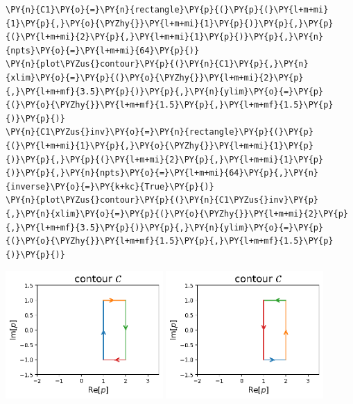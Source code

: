     \begin{tcolorbox}[breakable, size=fbox, boxrule=1pt, pad at break*=1mm,colback=cellbackground, colframe=cellborder]
\begin{Verbatim}[commandchars=\\\{\}]
\PY{n}{C1}\PY{o}{=}\PY{n}{rectangle}\PY{p}{(}\PY{p}{(}\PY{l+m+mi}{1}\PY{p}{,}\PY{o}{\PYZhy{}}\PY{l+m+mi}{1}\PY{p}{)}\PY{p}{,}\PY{p}{(}\PY{l+m+mi}{2}\PY{p}{,}\PY{l+m+mi}{1}\PY{p}{)}\PY{p}{,}\PY{n}{npts}\PY{o}{=}\PY{l+m+mi}{64}\PY{p}{)}
\PY{n}{plot\PYZus{}contour}\PY{p}{(}\PY{n}{C1}\PY{p}{,}\PY{n}{xlim}\PY{o}{=}\PY{p}{(}\PY{o}{\PYZhy{}}\PY{l+m+mi}{2}\PY{p}{,}\PY{l+m+mf}{3.5}\PY{p}{)}\PY{p}{,}\PY{n}{ylim}\PY{o}{=}\PY{p}{(}\PY{o}{\PYZhy{}}\PY{l+m+mf}{1.5}\PY{p}{,}\PY{l+m+mf}{1.5}\PY{p}{)}\PY{p}{)}
\PY{n}{C1\PYZus{}inv}\PY{o}{=}\PY{n}{rectangle}\PY{p}{(}\PY{p}{(}\PY{l+m+mi}{1}\PY{p}{,}\PY{o}{\PYZhy{}}\PY{l+m+mi}{1}\PY{p}{)}\PY{p}{,}\PY{p}{(}\PY{l+m+mi}{2}\PY{p}{,}\PY{l+m+mi}{1}\PY{p}{)}\PY{p}{,}\PY{n}{npts}\PY{o}{=}\PY{l+m+mi}{64}\PY{p}{,}\PY{n}{inverse}\PY{o}{=}\PY{k+kc}{True}\PY{p}{)}
\PY{n}{plot\PYZus{}contour}\PY{p}{(}\PY{n}{C1\PYZus{}inv}\PY{p}{,}\PY{n}{xlim}\PY{o}{=}\PY{p}{(}\PY{o}{\PYZhy{}}\PY{l+m+mi}{2}\PY{p}{,}\PY{l+m+mf}{3.5}\PY{p}{)}\PY{p}{,}\PY{n}{ylim}\PY{o}{=}\PY{p}{(}\PY{o}{\PYZhy{}}\PY{l+m+mf}{1.5}\PY{p}{,}\PY{l+m+mf}{1.5}\PY{p}{)}\PY{p}{)}
\end{Verbatim}
\end{tcolorbox}
\begin{center}
    \includegraphics[width=0.45\textwidth]{notebook/fig/output_9_0.eps}
    \includegraphics[width=0.45\textwidth]{notebook/fig/output_11_0.eps}
\end{center}
